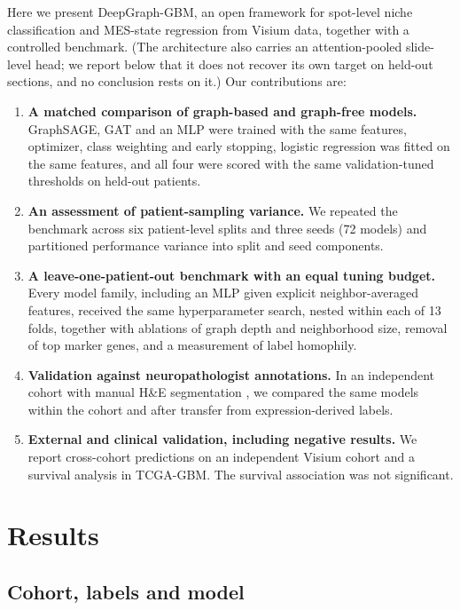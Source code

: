 \documentclass[11pt,letterpaper]{article}
\begin{document}
Here we present DeepGraph-GBM, an open framework for spot-level niche classification and MES-state regression from Visium data, together with a controlled benchmark. (The architecture also carries an attention-pooled slide-level head; we report below that it does not recover its own target on held-out sections, and no conclusion rests on it.) Our contributions are:
\begin{enumerate}
  \item \textbf{A matched comparison of graph-based and graph-free models.} GraphSAGE, GAT and an MLP were trained with the same features, optimizer, class weighting and early stopping, logistic regression was fitted on the same features, and all four were scored with the same validation-tuned thresholds on held-out patients.
  \item \textbf{An assessment of patient-sampling variance.} We repeated the benchmark across six patient-level splits and three seeds (72 models) and partitioned performance variance into split and seed components.
  \item \textbf{A leave-one-patient-out benchmark with an equal tuning budget.} Every model family, including an MLP given explicit neighbor-averaged features, received the same hyperparameter search, nested within each of 13 folds, together with ablations of graph depth and neighborhood size, removal of top marker genes, and a measurement of label homophily.
  \item \textbf{Validation against neuropathologist annotations.} In an independent cohort with manual H\&E segmentation \cite{ravi2022,ritter2025}, we compared the same models within the cohort and after transfer from expression-derived labels.
  \item \textbf{External and clinical validation, including negative results.} We report cross-cohort predictions on an independent Visium cohort and a survival analysis in TCGA-GBM. The survival association was not significant.
\end{enumerate}

\section{Results}

\subsection{Cohort, labels and model}
\end{document}
